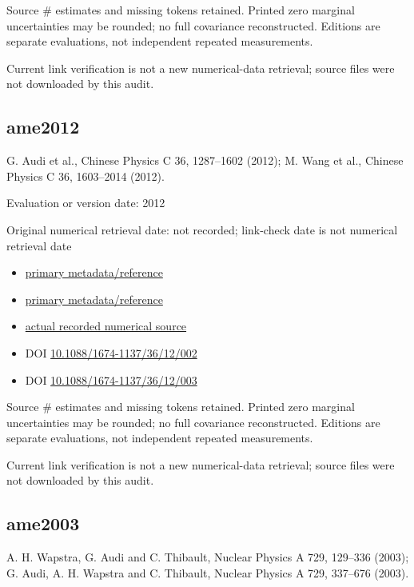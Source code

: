 \documentclass[
  11pt,
  letterpaper,
]{article}
\providecommand{\tightlist}{%
  \setlength{\itemsep}{0pt}\setlength{\parskip}{0pt}}
\begin{document}
Source \# estimates and missing tokens retained. Printed zero marginal
uncertainties may be rounded; no full covariance reconstructed. Editions
are separate evaluations, not independent repeated measurements.

Current link verification is not a new numerical-data retrieval; source
files were not downloaded by this audit.

\subsection{ame2012}\label{ame2012}

G. Audi et al., Chinese Physics C 36, 1287--1602 (2012); M. Wang et al.,
Chinese Physics C 36, 1603--2014 (2012).

Evaluation or version date: 2012

Original numerical retrieval date: not recorded; link-check date is not
numerical retrieval date

\begin{itemize}
\tightlist
\item
  \href{https://cpc.ihep.ac.cn/article/doi/10.1088/1674-1137/36/12/002}{primary
  metadata/reference}
\item
  \href{https://cpc.ihep.ac.cn/article/doi/10.1088/1674-1137/36/12/003}{primary
  metadata/reference}
\item
  \href{https://amdc.impcas.ac.cn/masstables/Ame2012/mass.mas12}{actual
  recorded numerical source}
\item
  DOI
  \href{https://doi.org/10.1088/1674-1137/36/12/002}{10.1088/1674-1137/36/12/002}
\item
  DOI
  \href{https://doi.org/10.1088/1674-1137/36/12/003}{10.1088/1674-1137/36/12/003}
\end{itemize}

Source \# estimates and missing tokens retained. Printed zero marginal
uncertainties may be rounded; no full covariance reconstructed. Editions
are separate evaluations, not independent repeated measurements.

Current link verification is not a new numerical-data retrieval; source
files were not downloaded by this audit.

\subsection{ame2003}\label{ame2003}

A. H. Wapstra, G. Audi and C. Thibault, Nuclear Physics A 729, 129--336
(2003); G. Audi, A. H. Wapstra and C. Thibault, Nuclear Physics A 729,
337--676 (2003).
\end{document}

